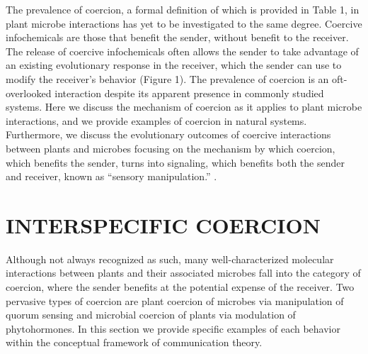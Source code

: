 The prevalence of coercion, a formal definition of which is provided in Table 1, in plant microbe interactions has yet to be investigated to the same degree. Coercive infochemicals are those that benefit the sender, without benefit to the receiver. The release of coercive infochemicals often allows the sender to take advantage of an existing evolutionary response in the receiver, which the sender can use to modify the receiver’s behavior (Figure 1). The prevalence of coercion is an oft-overlooked interaction despite its apparent presence in commonly studied systems. Here we discuss the mechanism of coercion as it applies to plant microbe interactions, and we provide examples of coercion in natural systems. Furthermore, we discuss the evolutionary outcomes of coercive interactions between plants and microbes focusing on the mechanism by which coercion, which benefits the sender, turns into signaling, which benefits both the sender and receiver, known as “sensory manipulation.” \parencite{scott-phillips2008,scott-phillips2012}. 

\section{INTERSPECIFIC COERCION}
Although not always recognized as such, many well-characterized molecular interactions between plants and their associated microbes fall into the category of coercion, where the sender benefits at the potential expense of the receiver. Two pervasive types of coercion are plant coercion of microbes via manipulation of quorum sensing and microbial coercion of plants via modulation of phytohormones. In this section we provide specific examples of each behavior within the conceptual framework of communication theory. 

